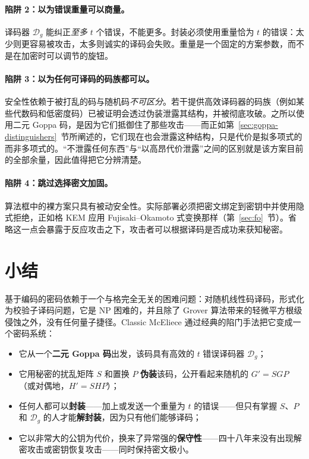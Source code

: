 \paragraph{陷阱 2：以为错误重量可以商量。}
译码器 $\mathcal{D}_g$ 能纠正\emph{至多} $t$ 个错误，不能更多。封装必须使用重量恰为 $t$ 的错误：太少则更容易被攻击，太多则诚实的译码会失败。重量是一个固定的方案参数，而不是在加密时可以调节的旋钮。

\paragraph{陷阱 3：以为任何可译码的码族都可以。}
安全性依赖于被打乱的码与随机码\emph{不可区分}。若干提供高效译码器的码族（例如某些代数码和低密度码）已被证明会透过伪装泄露其结构，并被彻底攻破。之所以使用二元 Goppa 码，是因为它们抵御住了那些攻击——而正如第~\ref{sec:goppa-distinguishers}~节所阐述的，它们现在也会泄露这种结构，只是代价是拟多项式的而非多项式的。“不泄露任何东西”与“以高昂代价泄露”之间的区别就是该方案目前的全部余量，因此值得把它分辨清楚。

\paragraph{陷阱 4：跳过选择密文加固。}
算法框中的裸方案只具有被动安全性。实际部署必须把密文绑定到密钥中并使用隐式拒绝，正如格 KEM 应用 Fujisaki--Okamoto 式变换那样（第~\ref{sec:fo}~节）。省略这一点会暴露于反应攻击之下，攻击者可以根据译码是否成功来获知秘密。

\section{小结}

基于编码的密码依赖于一个与格完全无关的困难问题：对随机线性码译码，形式化为校验子译码问题，它是 NP 困难的，并且除了 Grover 算法带来的轻微平方根级侵蚀之外，没有任何量子捷径。Classic McEliece 通过经典的陷门手法把它变成一个密码系统：

\begin{itemize}
  \item 它从一个\textbf{二元 Goppa 码}出发，该码具有高效的 $t$ 错误译码器 $\mathcal{D}_g$；
  \item 它用秘密的扰乱矩阵 $S$ 和置换 $P$ \textbf{伪装}该码，公开看起来随机的 $G' = SGP$（或对偶地，$H' = SHP$）；
  \item 任何人都可以\textbf{封装}——加上或发送一个重量为 $t$ 的错误——但只有掌握 $S$、$P$ 和 $\mathcal{D}_g$ 的人才能\textbf{解封装}，因为只有他们能够译码；
  \item 它以非常大的公钥为代价，换来了异常强的\textbf{保守性}——四十八年来没有出现解密攻击或密钥恢复攻击——同时保持密文极小。
\end{itemize}

